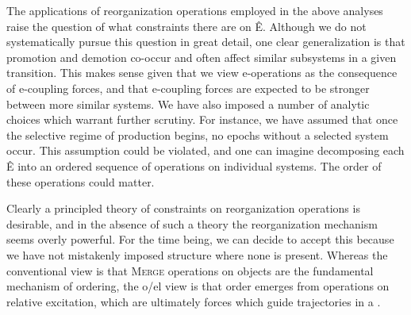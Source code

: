   The applications of reorganization operations employed in the above analyses raise the question of what constraints there are on Ê. Although we do not systematically pursue this question in great detail, one clear generalization is that promotion and demotion co-occur and often affect similar subsystems in a given transition. This makes sense given that we view e-operations as the consequence of e-coupling forces, and that e-coupling forces are expected to be stronger between more similar systems. We have also imposed a number of analytic choices which warrant further scrutiny. For instance, we have assumed that once the selective regime of production begins, no epochs without a selected system occur. This assumption could be violated, and one can imagine decomposing each Ê into an ordered sequence of operations on individual systems. The order of these operations could matter.

  Clearly a principled theory of constraints on reorganization operations is desirable, and in the absence of such a theory the reorganization mechanism seems overly powerful. For the time being, we can decide to accept this because we have not mistakenly imposed structure where none is present. Whereas the conventional view is that \textsc{Merge} operations on objects are the fundamental mechanism of ordering, the o/el view is that order emerges from operations on relative excitation, which are ultimately forces which guide trajectories in a .
